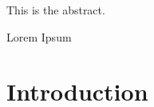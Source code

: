 \documentclass{gsuthesis}  %
\begin{document}
\frontmatter
{}

\begin{gsuabstract}
  This is the abstract.
\end{gsuabstract}

\begin{acknowledgments}
    Lorem Ipsum
\end{acknowledgments}

\tableofcontents
\listoffigures
\listoftables

\mainmatter
\chapter{Introduction}

\backmatter
\end{document}
